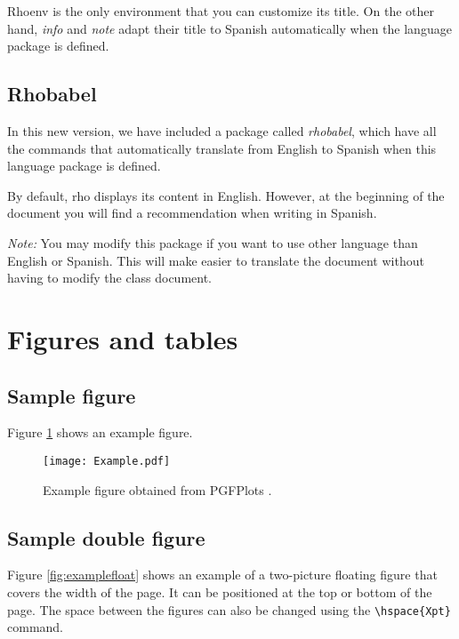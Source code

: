 \documentclass[9pt,a4paper,twoside]{rho-class/rho}
\begin{document}
        Rhoenv is the only environment that you can customize its title. On the other hand, \textit{info} and \textit{note} adapt their title to Spanish automatically when the language package is defined.

    \subsection{Rhobabel}

        In this new version, we have included a package called \textit{rhobabel}, which have all the commands that automatically translate from English to Spanish when this language package is defined. 
        
        By default, rho displays its content in English. However, at the beginning of the document you will find a recommendation when writing in Spanish. 
		
        \textit{Note:} You may modify this package if you want to use other language than English or Spanish. This will make easier to translate the document without having to modify the class document.

\section{Figures and tables}

    \subsection{Sample figure}

        Figure \ref{fig:figure} shows an example figure.
        
            \begin{figure}[H]
                \centering
                \texttt{[image: Example.pdf]}
                \caption{Example figure obtained from PGFPlots \cite{PFGPlots}.}
                \label{fig:figure}
            \end{figure}

    \subsection{Sample double figure}

        Figure \ref{fig:examplefloat} shows an example of a two-picture floating figure that covers the width of the page. It can be positioned at the top or bottom of the page. The space between the figures can also be changed using the \verb|\hspace{Xpt}| command.
\end{document}
